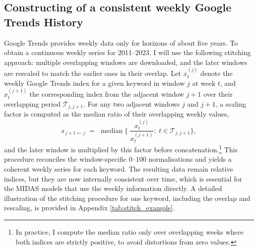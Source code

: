 \documentclass[12pt,a4paper]{article}
\begin{document}
\subsection{Constructing of a consistent weekly Google Trends History}
Google Trends provides weekly data only for horizons of about five years. To obtain a continuous weekly series for 2011–2023, I will use the following stitching approach: multiple overlapping windows are downloaded, and the later windows are rescaled to match the earlier ones in their overlap.
Let \(x_t^{(j)}\) denote the weekly Google Trends index for a given keyword in window \(j\) at week \(t\), and \(x_t^{(j+1)}\) the corresponding index from the adjacent window \(j+1\) over their overlapping period \(\mathcal{T}_{j,j+1}\). For any two adjacent windows \(j\) and \(j+1\), a scaling factor is computed as the median ratio of their overlapping weekly values,
\begin{equation}
s_{\,j{+}1 \leftarrow j}
\;=\;
\operatorname{median}
\Big\{\
\frac{x^{(j)}_{t}}{x^{(j+1)}_{t}}
:\; t \in \mathcal{T}_{j,j+1}
\Big\},
\label{eq:medianratio}
\end{equation}
and the later window is multiplied by this factor before concatenation.\footnote{In practice, I compute the median ratio only over overlapping weeks where both indices are strictly positive, to avoid distortions from zero values.}
This procedure reconciles the window-specific 0–100 normalisations and yields a coherent weekly series for each keyword. The resulting data remain relative indices, but they are now internally consistent over time, which is essential for the MIDAS models that use the weekly information directly. A detailed illustration of the stitching procedure for one keyword, including the overlap and rescaling, is provided in Appendix \ref{tab:stitch_example}.
\end{document}
